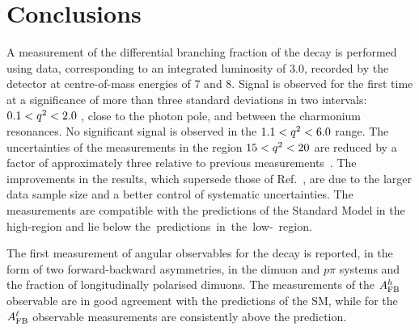 \section{Conclusions}
  A measurement of the differential branching fraction of the
  \decay{\Lb}{\Lz\mumu} decay is performed using data, corresponding
  to an integrated luminosity of 3.0\invfb, recorded by the \lhcb
  detector at centre-of-mass energies of 7 and 8\tev. Signal is
  observed for the first time at a significance of more than three
  standard deviations in two \qsq intervals: $0.1 < {q^2} < 2.0$
  \gevgevcccc, close to the photon pole, and between the charmonium
  resonances. No significant signal is observed in the $1.1 < {q^2} <
  6.0$ \gevgevcccc range. The uncertainties of the measurements in the
  region $15 < {q^2} < 20$ \gevgevcccc are reduced by a factor of
  approximately three relative to previous \lhcb
  measurements~\cite{LHCB-PAPER-2013-025}.  The improvements in the
  results, which supersede those of Ref.~\cite{LHCB-PAPER-2013-025},
  are due to the larger data sample size and a better control of
  systematic uncertainties.  The measurements are compatible with the
  predictions of the Standard Model in the high-\qsq region and lie
  below the~predictions~in~the~low-\qsq~region.

  The first measurement of angular observables for the
  \decay{\Lb}{\Lz\mumu} decay is reported, in the form of two
  forward-backward asymmetries, in the dimuon and $p\pi$ systems and
  the fraction of longitudinally polarised dimuons.  The measurements
  of the $A_{\rm FB}^h$ observable are in good agreement with the
  predictions of the SM, while for the $A_{\rm FB}^\ell$ observable
  measurements are consistently above the prediction.


